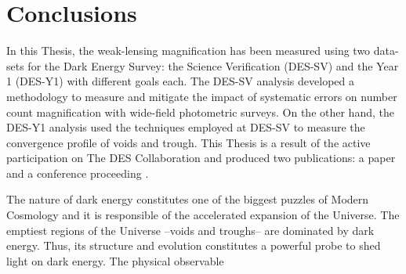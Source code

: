 \chapter{Conclusions}
\label{ch:conclusions}
In this Thesis, the weak-lensing magnification has been measured using two data-sets for the Dark Energy Survey: the Science Verification (DES-SV) and the Year 1 (DES-Y1) with different goals each. The DES-SV analysis developed a methodology to measure and mitigate the impact of systematic errors on number count magnification with wide-field photometric surveys. On the other hand, the DES-Y1 analysis used the techniques employed at DES-SV to measure the convergence profile of voids and trough. This Thesis is a result of the active participation on The DES Collaboration and produced two publications: a paper \cite{2016arXiv161110326G} and a conference proceeding \cite{2017hsa9.conf..163G}.
\newline

The nature of dark energy constitutes one of the biggest puzzles of Modern Cosmology and it is responsible of the accelerated expansion of the Universe. The emptiest regions of the Universe --voids and troughs-- are dominated by dark energy. Thus, its structure and evolution constitutes a powerful probe to shed light on dark energy. The physical observable